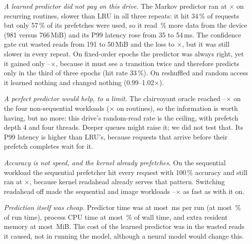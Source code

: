 \documentclass[conference]{IEEEtran}
\begin{document}
\begin{table}[!t]
\caption{Details for the two workloads where history can be learned. Hit, accuracy, wasted prefetch bytes, bytes the kernel read from the device, and P99 latency are medians over repeats; time is the median of undisturbed runs.}
\label{tab:realdetail}
\centering\scriptsize
\setlength{\tabcolsep}{3pt}

\end{table}

\emph{A learned predictor did not pay on this drive.} The Markov predictor ran at \realMarkovRoutines$\times$ on recurring routines, slower than LRU in all three repeats: it hit 34\,\% of requests but only 57\,\% of its prefetches were used, so it read \realExtraReadPct\,\% more data from the device (981 versus 766\,MiB) and its P99 latency rose from 35 to 54\,ms. The confidence gate cut wasted reads from 191 to 50\,MiB and the loss to \realGateRoutines$\times$, but it was still slower in every repeat. On fixed-order epochs the predictor was always right, yet it gained only \realMarkovFixed--\realGateFixed$\times$, because it must see a transition twice and therefore predicts only in the third of three epochs (hit rate 33\,\%). On reshuffled and random access it learned nothing and changed nothing (0.99--1.02$\times$).

\emph{A perfect predictor would help, to a limit.} The clairvoyant oracle reached \realOracleLo--\realOracleHi$\times$ on the four non-sequential workloads (\realOracleRoutines$\times$ on routines), so the information is worth having, but no more: this drive's random-read rate is the ceiling, with prefetch depth 4 and four threads. Deeper queues might raise it; we did not test that. Its P99 latency is higher than LRU's, because requests that arrive before their prefetch completes wait for it.

\emph{Accuracy is not speed, and the kernel already prefetches.} On the sequential workload the sequential prefetcher hit every request with 100\,\% accuracy and still ran at \realSeqSeq$\times$, because kernel readahead already serves that pattern. Switching readahead off made the sequential and image workloads \realNoRaLo--\realNoRaHi$\times$ as fast as with it on.

\emph{Prediction itself was cheap.} Predictor time was at most \realPredMsMax\,ms per run (at most \realPredPctMax\,\% of run time), process CPU time at most \realCpuMax\,\% of wall time, and extra resident memory at most \realRssMax\,MiB. The cost of the learned predictor was in the wasted reads it caused, not in running the model, although a neural model would change this.
\end{document}
